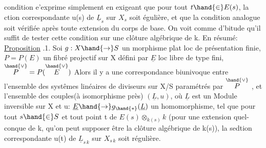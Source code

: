 
condition e'exprime simplement en exigeant que pour tout $t\hand{\in} E(s)$,
la ction correspondante u(s) de $\underline{L}_s$ sur $X_s$ soit égulière, et que la
condition analogue soit vérifiée après toute extension du corps de base.
On voit comme d'bitude qu'il suffit de tester cette condition sur une
clôture algébrique de k. En résumé:
\uline{Proposition} .1. Soi $g:X\hand{\to} S$ un morphisme plat loc de présentation
finie, $P=P(E)$ un fibré projectif sur X défini par $\underline{E}$ loc libre de type
fini, $\overset{\hand{\vee}}{P} = P(\overset{\hand{\vee}}{E})$ \hand{,} Alors il y a une correspondance biunivoque entre
l'ensemble des systêmes linéaires de diviseurs sur X/S paramétrés par $\overset{\hand{\vee}}{P}$ ,
et l'ensemble des couples(à isomorphisme près) $(\underline{L},u)$, où $\underline{L}$ est un
Module inversible sur X et u: $\underline{E}\hand{\to} g_{\hand{*}}(\underline{L})$ un homomorphisme, tel que
pour tout $s\hand{\in} S$ et tout point t de $E(s)\otimes_{k(s)}k$ (pour une extension quel-%
 conque de k, qu'on peut supposer être la clôture algébrique de k(s)),
la sedtion correspondante u(t) de $\underline{L}_{s\,k}$ sur $X_{s\,k}$ soit régulière.

